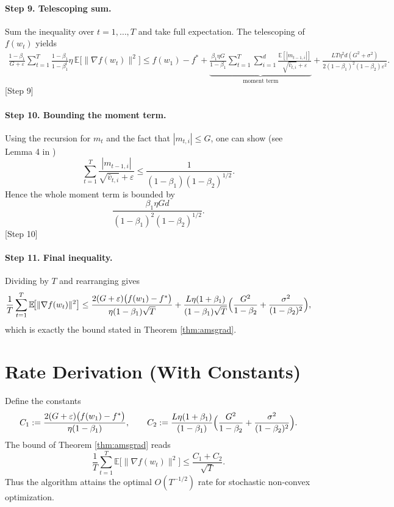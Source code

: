 \documentclass{article}
\begin{document}
\paragraph{Step 9. Telescoping sum.}
Sum the inequality over $t=1,\dots,T$ and take full expectation. The telescoping of $f(w_{t})$ yields
\[
\begin{aligned}
\frac{1-\beta_{1}}{G+\varepsilon}\sum_{t=1}^{T}\frac{1-\beta_{1}}{1-\beta_{1}^{t}}\eta\,
\mathbb{E}\!\bigl[\|\nabla f(w_{t})\|^{2}\bigr]
\le f(w_{1})-f^{*}
+ \underbrace{\frac{\beta_{1}\eta G}{1-\beta_{1}}\sum_{t=1}^{T}\sum_{i=1}^{d}\frac{\mathbb{E}[|m_{t-1,i}|]}{\sqrt{\hat v_{t,i}}+\varepsilon}}_{\text{moment term}}
+ \frac{LT\eta^{2}d(G^{2}+\sigma^{2})}{2(1-\beta_{1})^{2}(1-\beta_{2})\varepsilon^{2}}.
\end{aligned}
\] 
[Step 9]

\paragraph{Step 10. Bounding the moment term.}
Using the recursion for $m_{t}$ and the fact that $|m_{t,i}|\le G$, one can show (see Lemma 4 in \cite{redidi2018convergence})
\[
\sum_{t=1}^{T}\frac{|m_{t-1,i}|}{\sqrt{\hat v_{t,i}}+\varepsilon}
\le \frac{1}{(1-\beta_{1})(1-\beta_{2})^{1/2}}.
\] 
Hence the whole moment term is bounded by
\[
\frac{\beta_{1}\eta G d}{(1-\beta_{1})^{2}(1-\beta_{2})^{1/2}}.
\] 
[Step 10]

\paragraph{Step 11. Final inequality.}
Dividing by $T$ and rearranging gives
\[
\frac{1}{T}\sum_{t=1}^{T}\mathbb{E}\!\bigl[\|\nabla f(w_{t})\|^{2}\bigr]
\le
\frac{2(G+\varepsilon)\bigl(f(w_{1})-f^{*}\bigr)}{\eta(1-\beta_{1})\sqrt{T}}
+\frac{L\eta(1+\beta_{1})}{(1-\beta_{1})\sqrt{T}}
\Bigl(\frac{G^{2}}{1-\beta_{2}}+\frac{\sigma^{2}}{(1-\beta_{2})^{2}}\Bigr),
\] 
which is exactly the bound stated in Theorem \ref{thm:amsgrad}. \qedhere
[Step 11]

\section*{Rate Derivation (With Constants)}
Define the constants
\[
C_{1}:=\frac{2(G+\varepsilon)\bigl(f(w_{1})-f^{*}\bigr)}{\eta(1-\beta_{1})},
\qquad
C_{2}:=\frac{L\eta(1+\beta_{1})}{(1-\beta_{1})}
\Bigl(\frac{G^{2}}{1-\beta_{2}}+\frac{\sigma^{2}}{(1-\beta_{2})^{2}}\Bigr).
\]
The bound of Theorem \ref{thm:amsgrad} reads
\[
\frac{1}{T}\sum_{t=1}^{T}\mathbb{E}\!\bigl[\|\nabla f(w_{t})\|^{2}\bigr]\le
\frac{C_{1}+C_{2}}{\sqrt{T}}.
\]
Thus the algorithm attains the optimal $O(T^{-1/2})$ rate for stochastic non‑convex optimization.
\end{document}
